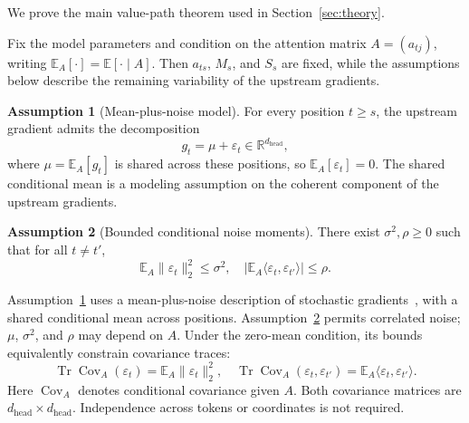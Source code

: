 \documentclass{article}
\theoremstyle{plain}
\theoremstyle{definition}
\newtheorem{assumption}{Assumption}
\theoremstyle{remark}
\begin{document}
We prove the main value-path theorem used in Section~\ref{sec:theory}.

Fix the model parameters and condition on the attention matrix $A=(a_{tj})$, writing $\mathbb{E}_A[\cdot]=\mathbb{E}[\cdot\mid A]$. Then $a_{ts}$, $M_s$, and $S_s$ are fixed, while the assumptions below describe the remaining variability of the upstream gradients.

\begin{assumption}[Mean-plus-noise model]\label{assump:mean-noise-app}
For every position $t\ge s$, the upstream gradient admits the decomposition
\[
    g_t = \mu + \varepsilon_t\in\mathbb{R}^{d_{\mathrm{head}}},
\]
where $\mu=\mathbb{E}_A[g_t]$ is shared across these positions, so $\mathbb{E}_A[\varepsilon_t]=0$. The shared conditional mean is a modeling assumption on the coherent component of the upstream gradients.
\end{assumption}

\begin{assumption}[Bounded conditional noise moments]\label{assump:cov-app}
There exist $\sigma^2,\rho\ge0$ such that for all $t \neq t'$,
\[
\mathbb{E}_A\|\varepsilon_t\|_2^2 \le \sigma^2, \quad
\bigl|\mathbb{E}_A\langle\varepsilon_t,\varepsilon_{t'}\rangle\bigr| \le \rho.
\]
\end{assumption}

Assumption~\ref{assump:mean-noise-app} uses a mean-plus-noise description of stochastic gradients~\cite{mandt2017sgd,mccandlish2018noise}, with a shared conditional mean across positions. Assumption~\ref{assump:cov-app} permits correlated noise; $\mu$, $\sigma^2$, and $\rho$ may depend on $A$. Under the zero-mean condition, its bounds equivalently constrain covariance traces:
\[
\operatorname{Tr}\operatorname{Cov}_A(\varepsilon_t)
=\mathbb{E}_A\|\varepsilon_t\|_2^2,\quad    \operatorname{Tr}\operatorname{Cov}_A(\varepsilon_t,\varepsilon_{t'})
=\mathbb{E}_A\langle\varepsilon_t,\varepsilon_{t'}\rangle.
\]
Here $\operatorname{Cov}_A$ denotes conditional covariance given $A$. Both covariance matrices are $d_{\mathrm{head}}\times d_{\mathrm{head}}$. Independence across tokens or coordinates is not required.
\end{document}
